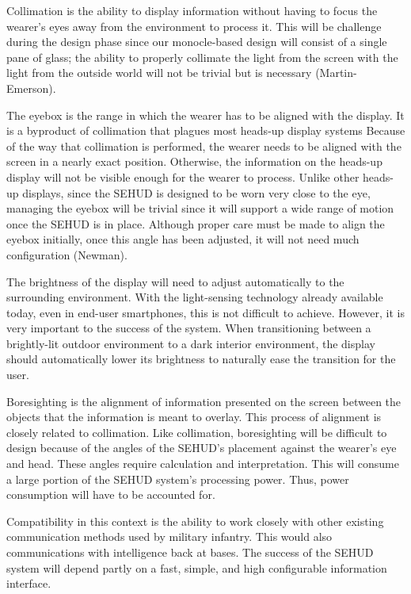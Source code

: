 Collimation is the ability to display information without having to focus the
wearer's eyes away from the environment to process it. This will be challenge
during the design phase since our monocle-based design will consist of a single
pane of glass; the ability to properly collimate the light from the screen with
the light from the outside world will not be trivial but is necessary
(Martin-Emerson).

The eyebox is the range in which the wearer has to be aligned with the display.
It is a byproduct of collimation that plagues most heads-up display systems
Because of the way that collimation is performed, the wearer needs to be aligned
with the screen in a nearly exact position. Otherwise, the information on the
heads-up display will not be visible enough for the wearer to process. Unlike other
heads-up displays, since the SEHUD is designed to be worn very close to the
eye, managing the eyebox will be trivial since it will support a wide range of
motion once the SEHUD is in place. Although proper care must be made to align
the eyebox initially, once this angle has been adjusted, it will not need much
configuration (Newman).

The brightness of the display will need to adjust automatically to the
surrounding environment. With the light-sensing technology already available
today, even in end-user smartphones, this is not difficult to achieve. However,
it is very important to the success of the system. When transitioning between a
brightly-lit outdoor environment to a dark interior environment, the display
should automatically lower its brightness to naturally ease the transition for
the user.

Boresighting is the alignment of information presented on the screen between
the objects that the information is meant to overlay. This process of
alignment is closely related to collimation. Like collimation, boresighting
will be difficult to design because of the angles of the SEHUD's placement
against the wearer's eye and head. These angles require calculation
and interpretation. This will consume a large portion of the SEHUD system's
processing power. Thus, power consumption will have to be accounted for.

Compatibility in this context is the ability to work closely with other
existing communication methods used by military infantry. This would also
communications with intelligence back at bases. The success of the SEHUD
system will depend partly on a fast, simple, and high configurable
information interface.

